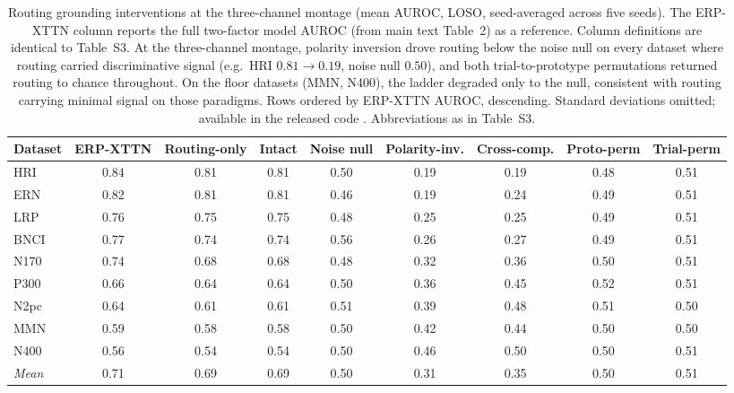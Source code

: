 \begin{table}[t]
\centering
\setlength{\tabcolsep}{5pt}
\caption{%
Routing grounding interventions at the three-channel montage (mean AUROC, LOSO, seed-averaged across five seeds). The ERP-XTTN column reports the full two-factor model AUROC (from main text Table~2) as a reference. Column definitions are identical to Table~S3. At the three-channel montage, polarity inversion drove routing below the noise null on every dataset where routing carried discriminative signal (e.g.\ HRI $0.81 \to 0.19$, noise null $0.50$), and both trial-to-prototype permutations returned routing to chance throughout. On the floor datasets (MMN, N400), the ladder degraded only to the null, consistent with routing carrying minimal signal on those paradigms. Rows ordered by ERP-XTTN AUROC, descending. Standard deviations omitted; available in the released code \cite{wyman2026erpxttn_code}. Abbreviations as in Table~S3.%
}
\label{sup:tab-grounding-3-routing}
\begin{tabular}{lcccccccc}
\toprule
Dataset & ERP-XTTN & Routing-only & Intact & Noise null & Polarity-inv. & Cross-comp. & Proto-perm & Trial-perm \\
\midrule
HRI & 0.84 & 0.81 & 0.81 & 0.50 & 0.19 & 0.19 & 0.48 & 0.51 \\
ERN & 0.82 & 0.81 & 0.81 & 0.46 & 0.19 & 0.24 & 0.49 & 0.51 \\
LRP & 0.76 & 0.75 & 0.75 & 0.48 & 0.25 & 0.25 & 0.49 & 0.51 \\
BNCI & 0.77 & 0.74 & 0.74 & 0.56 & 0.26 & 0.27 & 0.49 & 0.51 \\
N170 & 0.74 & 0.68 & 0.68 & 0.48 & 0.32 & 0.36 & 0.50 & 0.51 \\
P300 & 0.66 & 0.64 & 0.64 & 0.50 & 0.36 & 0.45 & 0.52 & 0.51 \\
N2pc & 0.64 & 0.61 & 0.61 & 0.51 & 0.39 & 0.48 & 0.51 & 0.50 \\
MMN & 0.59 & 0.58 & 0.58 & 0.50 & 0.42 & 0.44 & 0.50 & 0.50 \\
N400 & 0.56 & 0.54 & 0.54 & 0.50 & 0.46 & 0.50 & 0.50 & 0.51 \\
\midrule
\textit{Mean} & 0.71 & 0.69 & 0.69 & 0.50 & 0.31 & 0.35 & 0.50 & 0.51 \\
\bottomrule
\end{tabular}
\end{table}
